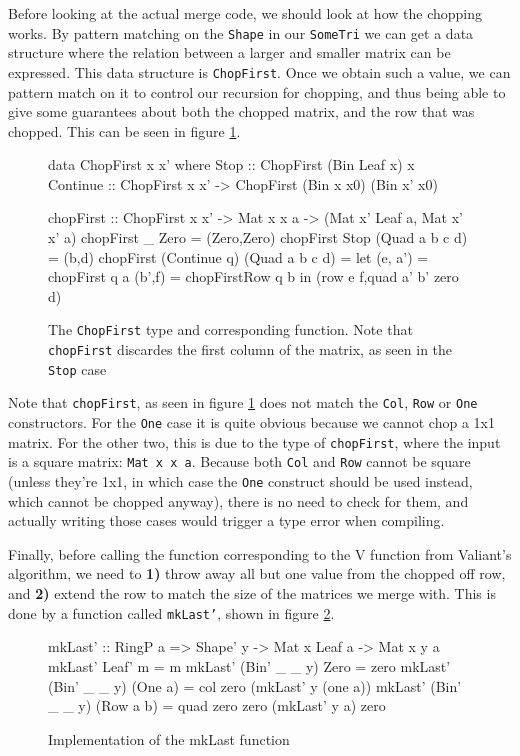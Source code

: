 \documentclass[a4paper,12pt,twosided]{report}
\begin{document}
Before looking at the actual merge code, we should look at how the chopping
works. By pattern matching on the \texttt{Shape} in our \texttt{SomeTri} we can
get a data structure where the relation between a larger and smaller matrix can
be expressed. This data structure is \texttt{ChopFirst}. Once we obtain such a
value, we can pattern match on it to control our recursion for chopping, and
thus being able to give some guarantees about both the chopped matrix, and the
row that was chopped. This can be seen in figure \ref{chopfirst}.

\begin{figure}[H]
\begin{code}
data ChopFirst x x' where
  Stop :: ChopFirst (Bin Leaf x) x
  Continue :: ChopFirst x x' -> ChopFirst (Bin x x0) (Bin x' x0)

chopFirst :: ChopFirst x x' -> Mat x x a  
                            -> (Mat x' Leaf a, Mat x' x' a)
chopFirst _ Zero = (Zero,Zero)
chopFirst Stop (Quad a b c d) = (b,d)
chopFirst (Continue q) (Quad a b c d) =
  let  (e, a') = chopFirst q a
       (b',f)  = chopFirstRow q b
  in (row e f,quad a' b' zero d)
\end{code}
\caption{\label{chopfirst} The \texttt{ChopFirst} type and corresponding
function. Note that \texttt{chopFirst} discardes the first column of the matrix, as seen
in the \texttt{Stop} case}
\end{figure}

Note that \texttt{chopFirst}, as seen in figure \ref{chopfirst} does not match
the \texttt{Col}, \texttt{Row} or \texttt{One} constructors. For the
\texttt{One} case it is quite obvious because we cannot chop a 1x1 matrix. For
the other two, this is due to the type of \texttt{chopFirst}, where the input is
a square matrix: \texttt{Mat x x a}. Because both \texttt{Col} and \texttt{Row}
cannot be square (unless they're 1x1, in which case the \texttt{One} construct
should be used instead, which cannot be chopped anyway), there is no need to
check for them, and actually writing those cases would trigger a type error when
compiling.

Finally, before calling the function corresponding to the V function from
Valiant's algorithm, we need to \textbf{1)} throw away all but one value from
the chopped off row, and \textbf{2)} extend the row to match the size of the
matrices we merge with. This is done by a function called \texttt{mkLast'},
shown in figure \ref{mklast}.

\begin{figure}[H]
\begin{code}
mkLast' :: RingP a => Shape' y -> Mat x Leaf a -> Mat x y a
mkLast' Leaf' m = m
mkLast' (Bin' _ _ y) Zero = zero
mkLast' (Bin' _ _ y) (One a) = col zero (mkLast' y (one a))
mkLast' (Bin' _ _ y) (Row a b) = quad zero zero (mkLast' y a) zero
\end{code}
\caption{\label{mklast}Implementation of the mkLast function}
\end{figure}
\end{document}
